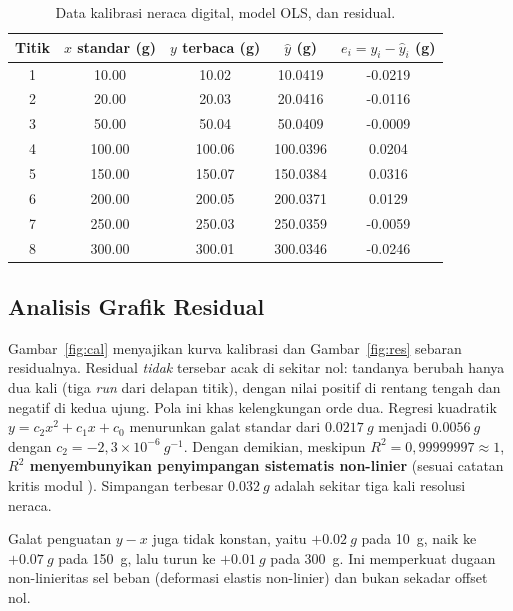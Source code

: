 \documentclass[a4paper, 12pt]{article}
\begin{document}
\begin{table}[H]
\centering
\singlespacing
\caption{Data kalibrasi neraca digital, model OLS, dan residual.}
\label{tab:cal}
\small
\begin{tabular}{c S[table-format=3.2] S[table-format=3.2] S[table-format=3.4] S[table-format=-1.4]}
\toprule
\textbf{Titik} & {$x$ standar (g)} & {$y$ terbaca (g)} & {$\hat{y}$ (g)} & {$e_i=y_i-\hat{y}_i$ (g)}\\
 & 10.00 & 10.02 & 10.0419 & -0.0219\\
2 & 20.00 & 20.03 & 20.0416 & -0.0116\\
3 & 50.00 & 50.04 & 50.0409 & -0.0009\\
4 & 100.00 & 100.06 & 100.0396 & 0.0204\\
5 & 150.00 & 150.07 & 150.0384 & 0.0316\\
6 & 200.00 & 200.05 & 200.0371 & 0.0129\\
7 & 250.00 & 250.03 & 250.0359 & -0.0059\\
8 & 300.00 & 300.01 & 300.0346 & -0.0246\\
\bottomrule
\end{tabular}
\end{table}

\begin{multicols}{2}
    \raggedcolumns
        \subsection{Analisis Grafik Residual}
        Gambar~\ref{fig:cal} menyajikan kurva kalibrasi dan Gambar~\ref{fig:res} sebaran residualnya. Residual \emph{tidak} tersebar acak di sekitar nol: tandanya berubah hanya dua kali (tiga \textit{run} dari delapan titik), dengan nilai positif di rentang tengah dan negatif di kedua ujung. Pola ini khas kelengkungan orde dua. Regresi kuadratik $y=c_2x^2+c_1x+c_0$ menurunkan galat standar dari $\SI{0,0217}{g}$ menjadi $\SI{0,0056}{g}$ dengan $c_2=-2{,}3\times10^{-6}\ \si{g^{-1}}$. Dengan demikian, meskipun $R^2=0{,}99999997\approx1$, \textbf{$R^2$ menyembunyikan penyimpangan sistematis non-linier} (sesuai catatan kritis modul \parencite{WinarnoYhuwana}). Simpangan terbesar $\SI{0,032}{g}$ adalah sekitar tiga kali resolusi neraca.

        Galat penguatan $y-x$ juga tidak konstan, yaitu $+\SI{0,02}{g}$ pada \SI{10}{g}, naik ke $+\SI{0,07}{g}$ pada \SI{150}{g}, lalu turun ke $+\SI{0,01}{g}$ pada \SI{300}{g}. Ini memperkuat dugaan non-linieritas sel beban (deformasi elastis non-linier) dan bukan sekadar offset nol.
\end{multicols}
\end{document}
